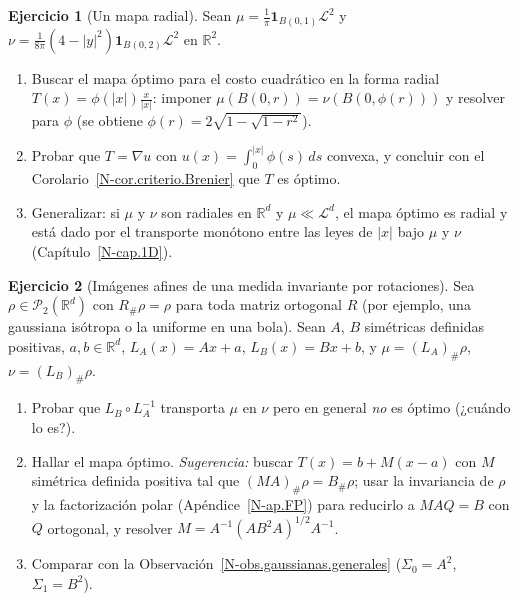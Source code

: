 \documentclass[11pt,a4paper]{amsart}
\newcounter{chapter}
\newcommand{\R}{{\mathbb R}}
\newcommand{\LL}{{\mathcal L}}
\newcommand{\I}{{\mathbf 1}}
\theoremstyle{remark}
\theoremstyle{definition}
\newtheorem{ejercicio}{Ejercicio}[chapter]
\numberwithin{subsection}{section}
\numberwithin{equation}{section}
\begin{document}
\begin{ejercicio}[Un mapa radial]\label{ejer.Brenier.radial}
Sean $\mu=\frac1\pi\I_{B(0,1)}\LL^2$ y $\nu=\frac1{8\pi}(4-|y|^2)\I_{B(0,2)}\LL^2$
en $\R^2$.
\begin{enumerate}[label=(\alph*)]
\item Buscar el mapa óptimo para el costo cuadrático en la forma radial
$T(x)=\phi(|x|)\frac{x}{|x|}$: imponer $\mu(B(0,r))=\nu(B(0,\phi(r)))$ y
resolver para $\phi$ (se obtiene $\phi(r)=2\sqrt{1-\sqrt{1-r^2}}$).
\item Probar que $T=\nabla u$ con $u(x)=\int_0^{|x|}\phi(s)\,ds$ convexa, y
concluir con el Corolario~\ref{N-cor.criterio.Brenier} que $T$ es óptimo.
\item Generalizar: si $\mu$ y $\nu$ son radiales en $\R^d$ y $\mu\ll\LL^d$,
el mapa óptimo es radial y está dado por el transporte monótono entre las
leyes de $|x|$ bajo $\mu$ y $\nu$ (Capítulo~\ref{N-cap.1D}).
\end{enumerate}
\end{ejercicio}

\begin{ejercicio}[Imágenes afines de una medida invariante por rotaciones]\label{ejer.Brenier.afines}
Sea $\rho\in\mathcal P_2(\R^d)$ con $R_\#\rho=\rho$ para toda matriz
ortogonal $R$ (por ejemplo, una gaussiana isótropa o la uniforme en una
bola). Sean $A$, $B$ simétricas definidas positivas, $a,b\in\R^d$,
$L_A(x)=Ax+a$, $L_B(x)=Bx+b$, y $\mu=(L_A)_\#\rho$, $\nu=(L_B)_\#\rho$.
\begin{enumerate}[label=(\alph*)]
\item Probar que $L_B\circ L_A^{-1}$ transporta $\mu$ en $\nu$ pero en
general \emph{no} es óptimo (¿cuándo lo es?).
\item Hallar el mapa óptimo. \emph{Sugerencia:} buscar $T(x)=b+M(x-a)$ con
$M$ simétrica definida positiva tal que $(MA)_\#\rho=B_\#\rho$; usar la
invariancia de $\rho$ y la factorización polar (Apéndice~\ref{N-ap.FP}) para
reducirlo a $MAQ=B$ con $Q$ ortogonal, y resolver
$M=A^{-1}(AB^2A)^{1/2}A^{-1}$.
\item Comparar con la Observación~\ref{N-obs.gaussianas.generales}
($\Sigma_0=A^2$, $\Sigma_1=B^2$).
\end{enumerate}
\end{ejercicio}
\end{document}

